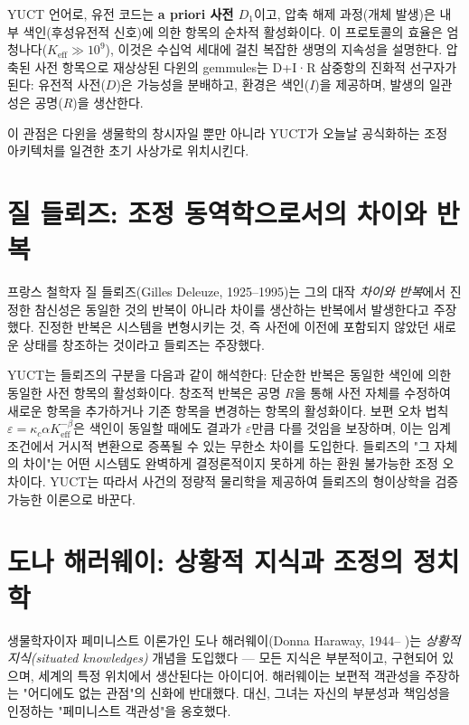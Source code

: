 \documentclass[12pt,a4paper]{article}
\begin{document}
	YUCT 언어로, 유전 코드는 \textbf{a priori 사전 \(D_1\)}이고, 압축 해제 과정(개체 발생)은 내부 색인(후성유전적 신호)에 의한 항목의 순차적 활성화이다. 이 프로토콜의 효율은 엄청나다(\(K_{\mathrm{eff}} \gg 10^9\)), 이것은 수십억 세대에 걸친 복잡한 생명의 지속성을 설명한다. 압축된 사전 항목으로 재상상된 다윈의 gemmules는 D+I·R 삼중항의 진화적 선구자가 된다: 유전적 사전(\(D\))은 가능성을 분배하고, 환경은 색인(\(I\))을 제공하며, 발생의 일관성은 공명(\(R\))을 생산한다.
	
	이 관점은 다윈을 생물학의 창시자일 뿐만 아니라 YUCT가 오늘날 공식화하는 조정 아키텍처를 일견한 초기 사상가로 위치시킨다.
	
	\section{질 들뢰즈: 조정 동역학으로서의 차이와 반복}
	
	프랑스 철학자 질 들뢰즈(Gilles Deleuze, 1925–1995)는 그의 대작 \emph{차이와 반복}에서 진정한 참신성은 동일한 것의 반복이 아니라 차이를 생산하는 반복에서 발생한다고 주장했다. 진정한 반복은 시스템을 변형시키는 것, 즉 사전에 이전에 포함되지 않았던 새로운 상태를 창조하는 것이라고 들뢰즈는 주장했다.
	
	YUCT는 들뢰즈의 구분을 다음과 같이 해석한다: 단순한 반복은 동일한 색인에 의한 동일한 사전 항목의 활성화이다. 창조적 반복은 공명 \(R\)을 통해 사전 자체를 수정하여 새로운 항목을 추가하거나 기존 항목을 변경하는 항목의 활성화이다. 보편 오차 법칙 \(\varepsilon = \kappa_c \alpha K_{\mathrm{eff}}^{-\beta}\)은 색인이 동일할 때에도 결과가 \(\varepsilon\)만큼 다를 것임을 보장하며, 이는 임계 조건에서 거시적 변환으로 증폭될 수 있는 무한소 차이를 도입한다. 들뢰즈의 "그 자체의 차이"는 어떤 시스템도 완벽하게 결정론적이지 못하게 하는 환원 불가능한 조정 오차이다. YUCT는 따라서 사건의 정량적 물리학을 제공하여 들뢰즈의 형이상학을 검증 가능한 이론으로 바꾼다.
	
	\section{도나 해러웨이: 상황적 지식과 조정의 정치학}
	
	생물학자이자 페미니스트 이론가인 도나 해러웨이(Donna Haraway, 1944– )는 \emph{상황적 지식(situated knowledges)} 개념을 도입했다 — 모든 지식은 부분적이고, 구현되어 있으며, 세계의 특정 위치에서 생산된다는 아이디어. 해러웨이는 보편적 객관성을 주장하는 "어디에도 없는 관점"의 신화에 반대했다. 대신, 그녀는 자신의 부분성과 책임성을 인정하는 "페미니스트 객관성"을 옹호했다.
	
\end{document}
